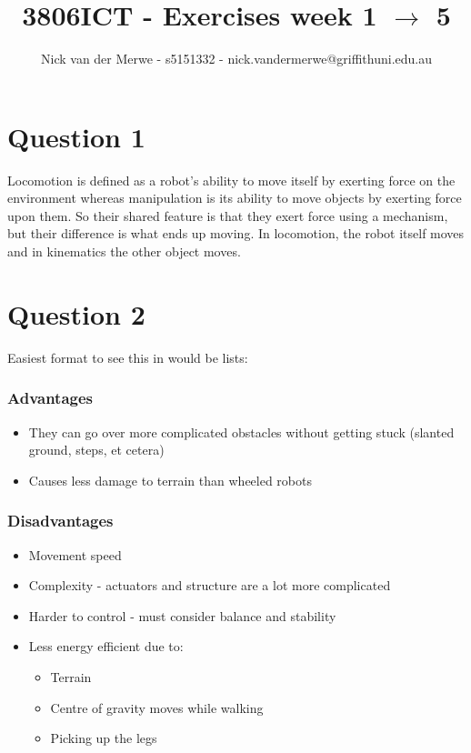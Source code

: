 \documentclass{article}
\title{3806ICT - Exercises week 1 $\rightarrow$ 5}
\author{Nick van der Merwe - s5151332 - nick.vandermerwe@griffithuni.edu.au}
\newcommand\tab[1][1cm]{\hspace*{#1}}
\begin{document}
\maketitle

\section*{Question 1}
Locomotion is defined as a robot's ability to move itself by exerting force on 
the environment whereas manipulation is its ability to move objects by 
exerting force upon them. So their shared feature is that they exert force using
a mechanism, but their difference is what ends up moving. In locomotion, the
robot itself moves and in kinematics the other object moves.
\section*{Question 2}
Easiest format to see this in would be lists:
\subsubsection*{Advantages}
\begin{itemize}
    \item They can go over more complicated obstacles without 
        getting stuck (slanted ground, steps, et cetera)
    \item Causes less damage to terrain than wheeled robots
\end{itemize}
\subsubsection*{Disadvantages}
\begin{itemize}
    \item Movement speed
    \item Complexity - actuators and structure are a lot more complicated
    \item Harder to control - must consider balance and stability
    \item Less energy efficient due to:
    \begin{itemize}
        \item Terrain
        \item Centre of gravity moves while walking
        \item Picking up the legs
    \end{itemize}
\end{itemize}
\end{document}

